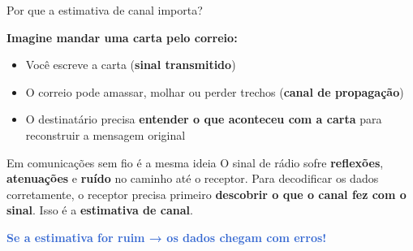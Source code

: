\documentclass[aspectratio=169, 11pt]{beamer}
\begin{document}
\begin{frame}{Por que a estimativa de canal importa?}

    \textbf{Imagine mandar uma carta pelo correio:}

    \pause
    \begin{itemize}
        \item Você escreve a carta (\textbf{sinal transmitido}) \pause
        \item O correio pode amassar, molhar ou perder trechos (\textbf{canal de propagação}) \pause
        \item O destinatário precisa \textbf{entender o que aconteceu com a carta} para reconstruir a mensagem original
    \end{itemize}

    \pause
    \vspace{0.5cm}
    \begin{block}{Em comunicações sem fio é a mesma ideia}
        O sinal de rádio sofre \textbf{reflexões}, \textbf{atenuações} e \textbf{ruído} no caminho até o receptor. Para decodificar os dados corretamente, o receptor precisa primeiro \textbf{descobrir o que o canal fez com o sinal}. Isso é a \textbf{estimativa de canal}.
    \end{block}

    \pause
    \vspace{0.3cm}
    \centering
    \textcolor{highlight}{\textbf{Se a estimativa for ruim → os dados chegam com erros!}}
\end{frame}

\end{document}
